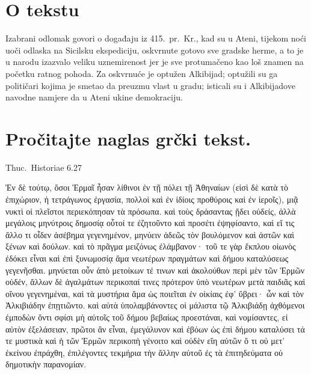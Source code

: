 

\section*{O tekstu}

Izabrani odlomak govori o događaju iz 415.\ pr.~Kr., kad su u Ateni, tijekom noći uoči odlaska na Sicilsku ekspediciju, oskvrnute gotovo sve gradske herme, a to je u narodu izazvalo veliku uznemirenost jer je sve protumačeno kao loš znamen na početku ratnog pohoda. Za oskvrnuće je optužen Alkibijad; optužili su ga političari kojima je smetao da preuzmu vlast u gradu; isticali su i Alkibijadove navodne namjere da u Ateni ukine demokraciju.


\section*{Pročitajte naglas grčki tekst.}

Thuc.\ Historiae 6.27


\medskip

\begin{greek}
{\large
{ \noindent Ἐν δὲ τούτῳ, ὅσοι Ἑρμαῖ ἦσαν λίθινοι ἐν τῇ πόλει τῇ Ἀθηναίων (εἰσὶ δὲ κατὰ τὸ ἐπιχώριον, ἡ τετράγωνος ἐργασία, πολλοὶ καὶ ἐν ἰδίοις προθύροις καὶ ἐν ἱεροῖς), μιᾷ νυκτὶ οἱ πλεῖστοι περιεκόπησαν τὰ πρόσωπα. καὶ τοὺς δράσαντας ᾔδει οὐδείς, ἀλλὰ μεγάλοις μηνύτροις δημοσίᾳ οὗτοί τε ἐζητοῦντο καὶ προσέτι ἐψηφίσαντο, καὶ εἴ τις ἄλλο τι οἶδεν ἀσέβημα γεγενημένον, μηνύειν ἀδεῶς τὸν βουλόμενον καὶ ἀστῶν καὶ ξένων καὶ δούλων. καὶ τὸ πρᾶγμα μειζόνως ἐλάμβανον· τοῦ τε γὰρ ἔκπλου οἰωνὸς ἐδόκει εἶναι καὶ ἐπὶ ξυνωμοσίᾳ ἅμα νεωτέρων πραγμάτων καὶ δήμου καταλύσεως  γεγενῆσθαι. μηνύεται οὖν ἀπὸ μετοίκων τέ τινων καὶ ἀκολούθων περὶ μὲν τῶν Ἑρμῶν οὐδέν, ἄλλων δὲ ἀγαλμάτων περικοπαί τινες πρότερον ὑπὸ νεωτέρων μετὰ παιδιᾶς καὶ οἴνου γεγενημέναι, καὶ τὰ μυστήρια ἅμα ὡς ποιεῖται ἐν οἰκίαις ἐφ' ὕβρει· ὧν καὶ τὸν Ἀλκιβιάδην ἐπῃτιῶντο. καὶ αὐτὰ ὑπολαμβάνοντες οἱ μάλιστα τῷ Ἀλκιβιάδῃ ἀχθόμενοι ἐμποδὼν ὄντι σφίσι μὴ αὐτοῖς τοῦ δήμου βεβαίως προεστάναι, καὶ νομίσαντες, εἰ αὐτὸν ἐξελάσειαν, πρῶτοι ἂν εἶναι, ἐμεγάλυνον καὶ ἐβόων ὡς ἐπὶ δήμου καταλύσει τά τε μυστικὰ καὶ ἡ τῶν Ἑρμῶν περικοπὴ γένοιτο καὶ οὐδὲν εἴη αὐτῶν ὅ τι οὐ μετ' ἐκείνου ἐπράχθη, ἐπιλέγοντες τεκμήρια τὴν ἄλλην αὐτοῦ ἐς τὰ ἐπιτηδεύματα οὐ δημοτικὴν παρανομίαν. 

}
}
\end{greek}

